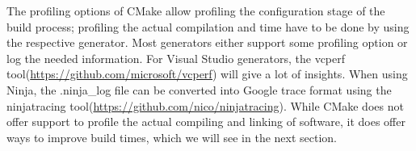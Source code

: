 The profiling options of CMake allow profiling the configuration stage of the build process; profiling the actual compilation and time have to be done by using the respective generator. Most generators either support some profiling option or log the needed information. For Visual Studio generators, the vcperf tool(\url{https://github.com/microsoft/vcperf}) will give a lot of insights. When using Ninja, the .ninja\_log file can be converted into Google trace format using the ninjatracing tool(\url{https://github.com/nico/ninjatracing}). While CMake does not offer support to profile the actual compiling and linking of software, it does offer ways to improve build times, which we will see in the next section.































